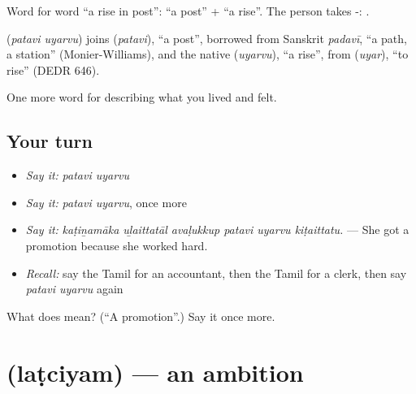 Word for word \textquotedblleft{}a rise in post\textquotedblright{}:  \textquotedblleft{}a post\textquotedblright{} +  \textquotedblleft{}a rise\textquotedblright{}. The person takes -:   .

\begin{cousinweb}
\textbf{ } (\emph{patavi uyarvu}) joins  (\emph{patavi}), \textquotedblleft{}a post\textquotedblright{}, borrowed from Sanskrit \emph{padavī}, \textquotedblleft{}a path, a station\textquotedblright{} (Monier-Williams), and the native  (\emph{uyarvu}), \textquotedblleft{}a rise\textquotedblright{}, from  (\emph{uyar}), \textquotedblleft{}to rise\textquotedblright{} (DEDR 646).
\end{cousinweb}

\begin{grammarlens}[title={What you've built}]
One more word for describing what you lived and felt.
\end{grammarlens}

\subsection*{Your turn}
\begin{itemize}
\raggedright
  \item \emph{Say it:} \emph{patavi uyarvu}
  \item \emph{Say it:} \emph{patavi uyarvu}, once more
  \item \emph{Say it:} \emph{kaṭiṉamāka uḻaittatāl avaḷukkup patavi uyarvu kiṭaittatu.} — She got a promotion because she worked hard.
  \item \emph{Recall:} say the Tamil for an accountant, then the Tamil for a clerk, then say \emph{patavi uyarvu} again
\end{itemize}

\begin{tcolorbox}[breakable,colback=teal!4,colframe=teal!35!black,title={Before you move on}]
What does   mean? (\textquotedblleft{}A promotion\textquotedblright{}.) Say it once more.
\end{tcolorbox}
\section[\texorpdfstring{\ta{லட்சியம்} (laṭciyam)}{லட்சியம் (laṭciyam)}]{ (laṭciyam) — an ambition}

\label{lesson:TA-C509-latciyam}



